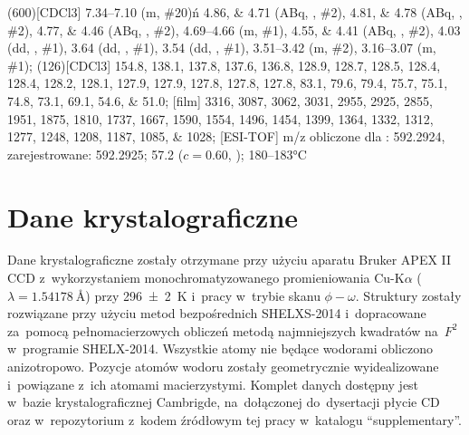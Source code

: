 \begin{fullexp}
	\NMR(600)[CDCl3] \numrange{7.34}{7.10} (m, \#{20})ń \numlist{4.86;4.71} (ABq, , \#{2}), \numlist{4.81;4.78} (ABq, , \#{2}), \numlist{4.77;4.46} (ABq, , \#{2}), \numrange{4.69}{4.66} (m, \#{1}), \numlist{4.55;4.41} (ABq, , \#{2}), \num{4.03} (dd, , \#{1}), \num{3.64} (dd, , \#{1}), \num{3.54} (dd, , \#{1}), \numrange{3.51}{3.42} (m, \#{2}), \numrange{3.16}{3.07} (m, \#{1});
	(126)[CDCl3] \numlist{154.8; 138.1; 137.8; 137.6; 136.8; 128.9; 128.7; 128.5; 128.4; 128.4; 128.2; 128.1; 127.9; 127.9; 127.8; 127.8; 127.8; 83.1; 79.6; 79.4; 75.7; 75.1; 74.8; 73.1; 69.1; 54.6; 51.0};
	[film] \numlist{3316; 3087; 3062; 3031; 2955; 2925; 2855; 1951; 1875; 1810; 1737; 1667; 1590; 1554; 1496; 1454; 1399; 1364; 1332; 1312; 1277; 1248; 1208; 1187; 1085; 1028};
	[ESI-TOF] m/z obliczone dla : \num{592.2924}, zarejestrowane: \num{592.2925};
	\data{[$\alpha^{23}_D$]~$=$} \num{57.2} ($c = 0.60$, );
	 \numrange{180}{183}\si{\celsius}
\end{fullexp}


\section{Dane krystalograficzne}
Dane krystalograficzne zostały otrzymane przy użyciu aparatu Bruker APEX II CCD
  z~wykorzystaniem monochromatyzowanego promieniowania Cu-K$\alpha$
	($\lambda=\SI{1.54178}{\angstrom}$) przy \SI{296(2)}{\kelvin} i~pracy w~trybie skanu $\phi-\omega$.
Struktury zostały rozwiązane przy użyciu metod bezpośrednich SHELXS-2014 
	i~dopracowane za~pomocą pełnomacierzowych obliczeń metodą najmniejszych kwadratów na~$F^2$
	w~programie SHELX-2014.
Wszystkie atomy nie będące wodorami obliczono anizotropowo.
Pozycje atomów wodoru zostały geometrycznie wyidealizowane i~powiązane z~ich atomami macierzystymi.
Komplet danych dostępny jest w~bazie krystalograficznej Cambrigde, na~dołączonej do~dysertacji płycie CD oraz w~repozytorium z~kodem źródłowym tej
	pracy w~katalogu \enquote{supplementary}.


